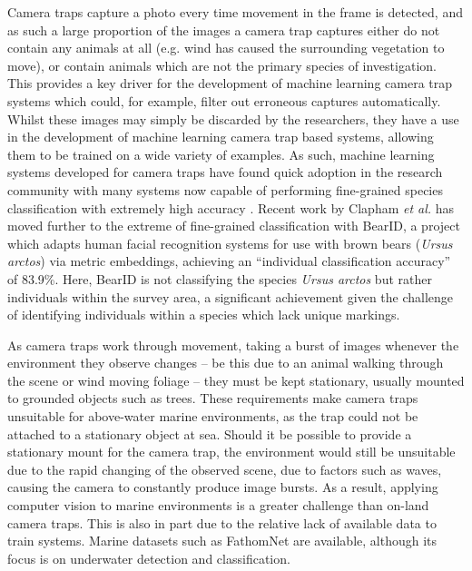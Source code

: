 Camera traps capture a photo every time movement in the frame is detected, and as such a large proportion of the images a camera trap captures either do not contain any animals at all (e.g. wind has caused the surrounding vegetation to move), or contain animals which are not the primary species of investigation. This provides a key driver for the development of machine learning camera trap systems which could, for example, filter out erroneous captures automatically. Whilst these images may simply be discarded by the researchers, they have a use in the development of machine learning camera trap based systems, allowing them to be trained on a wide variety of examples. As such, machine learning systems developed for camera traps have found quick adoption in the research community with many systems now capable of performing fine-grained species classification with extremely high accuracy \cite{tabak_machine_2019, norouzzadeh_automatically_2018, willi_identifying_2019, beery_efficient_2019, norouzzadeh_deep_2019}. Recent work by Clapham \textit{et al.} \cite{clapham_automated_2020} has moved further to the extreme of fine-grained classification with BearID, a project which adapts human facial recognition systems for use with brown bears (\textit{Ursus arctos}) via metric embeddings, achieving an ``individual classification accuracy'' of 83.9\%. Here, BearID is not classifying the species \textit{Ursus arctos} but rather individuals within the survey area, a significant achievement given the challenge of identifying individuals within a species which lack unique markings.

As camera traps work through movement, taking a burst of images whenever the environment they observe changes -- be this due to an animal walking through the scene or wind moving foliage -- they must be kept stationary, usually mounted to grounded objects such as trees. These requirements make camera traps unsuitable for above-water marine environments, as the trap could not be attached to a stationary object at sea. Should it be possible to provide a stationary mount for the camera trap, the environment would still be unsuitable due to the rapid changing of the observed scene, due to factors such as waves, causing the camera to constantly produce image bursts. As a result, applying computer vision to marine environments is a greater challenge than on-land camera traps. This is also in part due to the relative lack of available data to train systems. Marine datasets such as FathomNet \cite{katija_fathomnet_2022} are available, although its focus is on underwater detection and classification.

